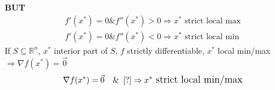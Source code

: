 \begin{center}

\end{center}
\textbf{BUT}
\begin{gather*}
	f'(x^*) = 0 \& f''(x^*) > 0 \Longrightarrow x^* \text{ strict local max}\\
	f'(x^*) = 0 \& f''(x^*) < 0 \Longrightarrow x^* \text{ strict local min}
\end{gather*}
If $S \subseteq \mathbb{R}^n$, $x^*$ interior part of $S$, $f$ strictly differentiable, $x^*$ local min/max $\Longrightarrow \nabla f(x^*) = \vec{0}$
\begin{equation*}
	\nabla f(x^*) = \vec{0} \quad {\large \&} \hspace{0.5em} \large[ ? \large] \Rightarrow x^* \text{ strict local min/max}
\end{equation*}
